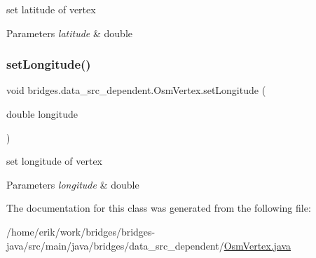 set latitude of vertex 
\begin{DoxyParams}{Parameters}
{\em latitude} & double \\
\hline
\end{DoxyParams}
\mbox{\label{classbridges_1_1data__src__dependent_1_1_osm_vertex_a2b4ac472641b5b206cff7db53ce3285b}} 
\subsubsection{\texorpdfstring{set\+Longitude()}{setLongitude()}}
{\footnotesize\ttfamily void bridges.\+data\+\_\+src\+\_\+dependent.\+Osm\+Vertex.\+set\+Longitude (\begin{DoxyParamCaption}\item[{double}]{longitude }\end{DoxyParamCaption})}

set longitude of vertex 
\begin{DoxyParams}{Parameters}
{\em longitude} & double \\
\hline
\end{DoxyParams}


The documentation for this class was generated from the following file\+:\begin{DoxyCompactItemize}
\item 
/home/erik/work/bridges/bridges-\/java/src/main/java/bridges/data\+\_\+src\+\_\+dependent/\hyperlink{_osm_vertex_8java}{Osm\+Vertex.\+java}\end{DoxyCompactItemize}
